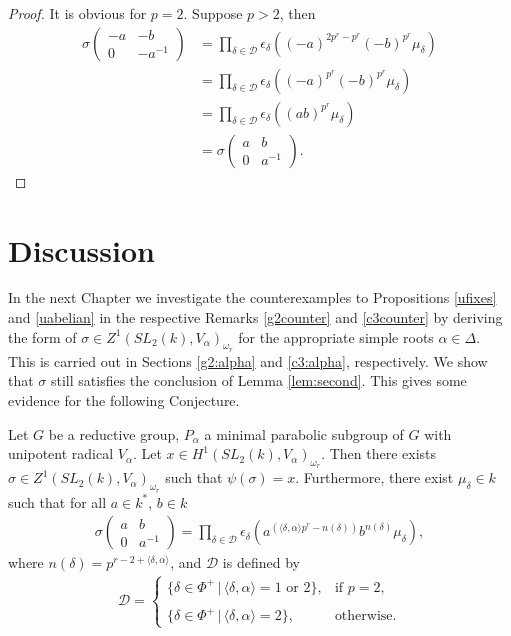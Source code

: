 \begin{proof} It is obvious for $p=2$. Suppose $p>2$, then
\begin{align*}
	\sigma\left(\begin{matrix}-a & -b\\0 & -a^{-1}\end{matrix}\right) &= \prod_{\delta\in\mathcal{D}} \epsilon_\delta\left((-a)^{2p^r - p^r}(-b)^{p^r}\mu_\delta \right) \\
	&= \prod_{\delta\in\mathcal{D}} \epsilon_\delta\left((-a)^{p^r}(-b)^{p^r}\mu_\delta \right) \\
	&= \prod_{\delta\in\mathcal{D}} \epsilon_\delta\left((ab)^{p^r}\mu_\delta \right) \\
	&=\sigma\left(\begin{matrix}a & b\\0 & a^{-1}\end{matrix}\right).
\end{align*}
\end{proof}

\section{Discussion} \label{ch5_discussion}

In the next Chapter we investigate the counterexamples to Propositions \ref{ufixes} and \ref{uabelian} in the respective Remarks \ref{g2counter} and \ref{c3counter} by deriving the form of $\sigma\in Z^1(SL_2(k), V_\alpha)_{\omega_r}$ for the appropriate simple roots $\alpha\in\Delta$. This is carried out in Sections \ref{g2:alpha} and \ref{c3:alpha}, respectively. We show that $\sigma$ still satisfies the conclusion of Lemma \ref{lem:second}. This gives some evidence for the following Conjecture.
\begin{conjecture}\label{bigclaim} Let $G$ be a reductive group, $P_\alpha$ a minimal parabolic subgroup of $G$ with unipotent radical $V_\alpha$. Let $x \in H^1(SL_2(k), V_\alpha)_{\omega_r}$. Then there exists $\sigma \in Z^1(SL_2(k), V_\alpha)_{\omega_r}$ such that $\psi(\sigma) = x$. Furthermore, there exist $\mu_\delta\in k$ such that for all $a\in k^*$, $b\in k$
\begin{align*}
	\sigma\left(\begin{matrix}a & b \\0 & a^{-1}\end{matrix}\right) = \prod_{\delta\in\mathcal{D}} \epsilon_\delta\left(a^{(\langle\delta,\alpha\rangle p^r -n(\delta))}b^{n(\delta)}\mu_\delta\right),
\end{align*}
where $n(\delta)=p^{r-2+\langle\delta,\alpha\rangle}$, and $\mathcal{D}$ is defined by
\begin{align*}
\mathcal{D} = 
		\left\{\begin{array}{ll}
			\{\delta \in \Phi^+ \,|\, \langle \delta, \alpha \rangle = 1\textrm{ or }2\}, & \textrm{if }p = 2,\\ \\
			\{\delta \in \Phi^+ \,|\, \langle \delta, \alpha \rangle = 2\}, & \textrm{otherwise}.
		\end{array}\right.
\end{align*}
\end{conjecture}

